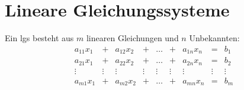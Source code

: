\section{\label{sec:Lineare-Gleichungssysteme}Lineare Gleichungssysteme}

Ein \gls{lgs} besteht aus $m$ linearen Gleichungen und $n$ Unbekannten:
\[
\begin{matrix}
  a_{11} x_1 & +      & a_{12} x_2 & +      & \ldots & +      & a_{1n} x_n & =      & b_1   \\
  a_{21} x_1 & +      & a_{22} x_2 & +      & \ldots & +      & a_{2n} x_n & =      & b_2   \\
  \vdots     & \vdots & \vdots     & \vdots & \vdots & \vdots & \vdots     & \vdots & \vdots\\
  a_{m1} x_1 & +      & a_{m2} x_2 & +      & \ldots & +      & a_{mn} x_n & =      & b_m
\end{matrix}
\]

